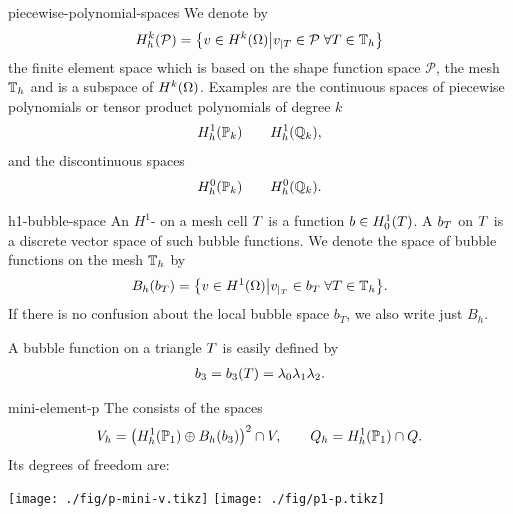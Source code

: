 \begin{Notation}{piecewise-polynomial-spaces}
  We denote by
  \begin{gather}
    \label{eq:stokes:8}
    H^k_h(\mathcal P) =
    \bigl\{ v\in H^k(\Omega) \big\vert
    v_{|\cell} \in \mathcal P \;\forall \cell\in\mesh_h\bigr\}
  \end{gather}
  the finite element space which is based on the shape function space
  $\mathcal P$, the mesh $\mesh_h$ and is a subspace of
  $H^k(\domain)$. Examples are the continuous spaces of piecewise
  polynomials or tensor product polynomials of degree $k$
  \begin{gather*}
    H^1_h(\P_k) \qquad H^1_h(\Q_k),
  \end{gather*}
  and the discontinuous spaces
  \begin{gather*}
    H^0_h(\P_k) \qquad H^0_h(\Q_k).
  \end{gather*}
\end{Notation}

\begin{Definition}{h1-bubble-space}
  An $H^1$- on a mesh cell $\cell$ is a
  function $b\in H^1_0(\cell)$. A  $b_\cell$ on
  $\cell$ is a discrete vector space of such bubble functions.  We
  denote the space of bubble functions on the mesh $\mesh_h$ by
  \begin{gather*}
    B_h(b_\cell) = \bigl\{ v\in H^1(\domain) \big\vert
    v_{|_\cell} \in b_\cell \;\forall \cell\in\mesh_h
    \bigr\}.
  \end{gather*}
  If there is no confusion about the local bubble space $b_T$, we also
  write just $B_h$.
\end{Definition}

\begin{example}
  A bubble function on a triangle $\cell$ is easily defined by
  \begin{gather}
    \label{eq:stokes:7}
    b_3 = b_3(\cell) = \lambda_0\lambda_1\lambda_2.
  \end{gather}
\end{example}

\begin{Definition}{mini-element-p}
  The  consists of the spaces
  \begin{gather}
    V_h = \bigl(H^1_h(\P_1) \oplus B_h(b_3)\bigr)^2 \cap V,
    \qquad
    Q_h = H^1_h(\P_1) \cap Q.
  \end{gather}
  Its degrees of freedom are:
  \begin{center}
    \texttt{[image: ./fig/p-mini-v.tikz]}
    \hspace{1cm}
    \texttt{[image: ./fig/p1-p.tikz]}
  \end{center}
\end{Definition}

